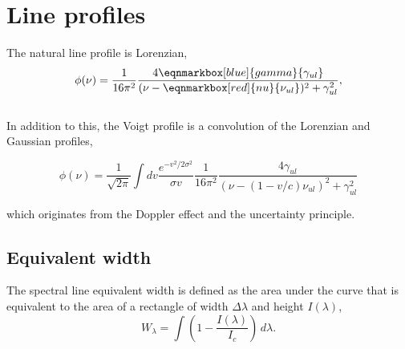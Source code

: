 \section{Line profiles}
The natural line profile is \textsf{Lorenzian},
\begin{equation}
  \phi(\nu) = \frac{1}{16\pi^2}\frac{4\eqnmarkbox[blue]{gamma}{\gamma_{ul}}}{(\nu-\eqnmarkbox[red]{nu}{\nu_{ul}})^2+\gamma_{ul}^2}, 
\end{equation}
\\

\vspace{-5mm}
In addition to this, the \textsf{Voigt profile} is a convolution of the Lorenzian and Gaussian profiles,
\begin{Note}
\begin{equation}
  \phi(\nu) = \frac{1}{\sqrt{2\pi}} \int dv \frac{e^{-v^2/2\sigma^2}}{\sigma v} \frac{1}{16\pi^2}\frac{4\gamma_{ul}}{(\nu-(1-v/c)\nu_{ul})^2+\gamma_{ul}^2} 
\end{equation}
\end{Note}
which originates from the Doppler effect and the uncertainty principle.

\begin{center}
\end{center}

\subsection{Equivalent width}
The spectral line \textsf{equivalent width} is defined as the area under the curve that is equivalent to the area of a rectangle of width $\Delta\lambda$ and height $I(\lambda)$,
\begin{equation}
  W_\lambda = \int \left(1-\frac{I(\lambda)}{I_c}\right)\,d\lambda. 
\end{equation}

